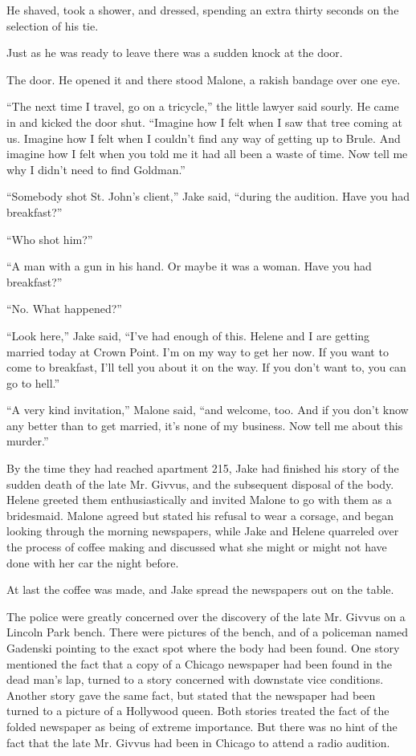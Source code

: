 \documentclass{novel}
\begin{document}
He shaved, took a shower, and dressed, spending an extra thirty seconds on the selection of his tie.

Just as he was ready to leave there was a sudden knock at the door.

The door. He opened it and there stood Malone, a rakish bandage over one eye.

“The next time I travel, go on a tricycle,” the little lawyer said sourly. He came in and kicked the door shut. “Imagine how I felt when I saw that tree coming at us. Imagine how I felt when I couldn’t find any way of getting up to Brule. And imagine how I felt when you told me it had all been a waste of time. Now tell me why I didn’t need to find Goldman.”

“Somebody shot St. John’s client,” Jake said, “during the audition. Have you had breakfast?”

“Who shot him?”

“A man with a gun in his hand. Or maybe it was a woman. Have you had breakfast?”

“No. What happened?”

“Look here,” Jake said, “I’ve had enough of this. Helene and I are getting married today at Crown Point. I’m on my way to get her now. If you want to come to breakfast, I'll tell you about it on the way. If you don’t want to, you can go to hell.”

“A very kind invitation,” Malone said, “and welcome, too. And if you don’t know any better than to get married, it’s none of my business. Now tell me about this murder.”

By the time they had reached apartment 215, Jake had finished his story of the sudden death of the late Mr. Givvus, and the subsequent disposal of the body. Helene greeted them enthusiastically and invited Malone to go with them as a bridesmaid. Malone agreed but stated his refusal to wear a corsage, and began looking through the morning newspapers, while Jake and Helene quarreled over the process of coffee making and discussed what she might or might not have done with her car the night before.

At last the coffee was made, and Jake spread the newspapers out on the table.

The police were greatly concerned over the discovery of the late Mr. Givvus on a Lincoln Park bench. There were pictures of the bench, and of a policeman named Gadenski pointing to the exact spot where the body had been found. One story mentioned the fact that a copy of a Chicago newspaper had been found in the dead man’s lap, turned to a story concerned with downstate vice conditions. Another story gave the same fact, but stated that the newspaper had been turned to a picture of a Hollywood queen. Both stories treated the fact of the folded newspaper as being of extreme importance. But there was no hint of the fact that the late Mr. Givvus had been in Chicago to attend a radio audition.
\end{document}
